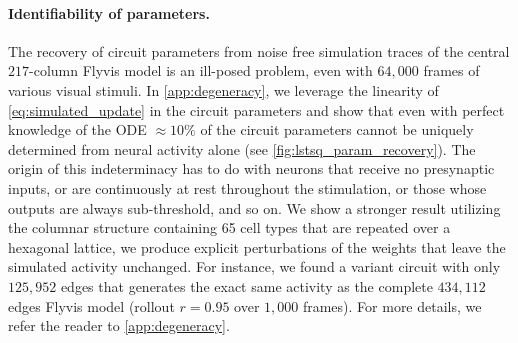 \documentclass{article}
\begin{document}
\paragraph{Identifiability of parameters.} 
The recovery of circuit parameters from noise free simulation traces of the central $217$-column Flyvis model is an ill-posed problem, even with $64{,}000$ frames of various visual stimuli. In \cref{app:degeneracy}, we leverage the linearity of \cref{eq:simulated_update} in the circuit parameters and show that even with perfect knowledge of the ODE $\approx 10\%$ of the circuit parameters cannot be uniquely determined from neural activity alone (see \cref{fig:lstsq_param_recovery}). The origin of this indeterminacy has to do with neurons that receive no presynaptic inputs, or are continuously at rest throughout the stimulation, or those whose outputs are always sub-threshold, and so on. We show a stronger result \textemdash utilizing the columnar structure containing 65 cell types that are repeated over a hexagonal lattice, we produce explicit perturbations of the weights that leave the simulated activity unchanged. 
For instance, we found a variant circuit with only $125{,}952$ edges that generates the exact same activity as the complete $434{,}112$ edges Flyvis model (rollout $r = 0.95$ over $1{,}000$ frames). For more details, we refer the reader to \cref{app:degeneracy}.
\end{document}

